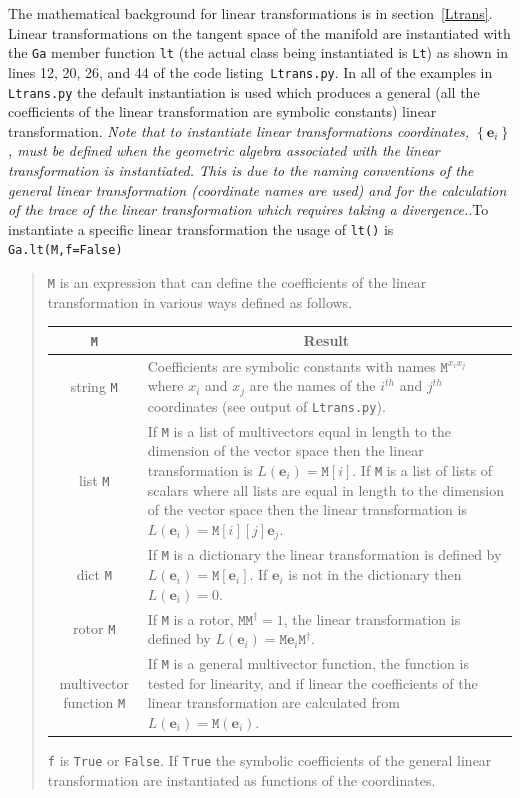 \documentclass[12pt]{report}
\newcommand{\bm}[1]{\boldsymbol{#1}}
\newcommand{\ebf}{\bm{e}}
\newcommand{\mat}[1]{\left [ {#1} \right ]}
\newcommand{\lp}{\left (}
\newcommand{\rp}{\right )}
\newcommand{\lbrc}{\left \{}
\newcommand{\rbrc}{\right \}}
\newcommand{\set}[1]{\lbrc {#1} \rbrc}
\newcommand{\R}{\dagger}
\newcommand{\f}[2]{{#1}\lp {#2} \rp}
\newcommand{\T}[1]{\texttt{#1}}
\begin{document}
The mathematical background for linear transformations is in section~\ref{Ltrans}.  Linear transformations on the tangent space of
the manifold are instantiated with the \T{Ga} member function \T{lt} (the actual class being instantiated is \T{Lt}) as shown in
 lines 12, 20, 26, and 44 of the 
code listing~\T{Ltrans.py}. In all of the examples in \T{Ltrans.py} the default instantiation is used which produces a general (all the
coefficients of the linear transformation are symbolic constants) linear transformation. \emph{Note that to instantiate linear transformations
coordinates, $\set{\bm{e}_{i}}$, must be defined when the geometric algebra associated with the linear transformation is instantiated.  
This is due to the naming conventions of the general linear transformation (coordinate names are used) and for the calculation 
of the trace of the linear transformation which requires taking a divergence.}.To instantiate a specific linear transformation
the usage of \T{lt()} is 
\T{Ga.lt(M,f=False)}
\begin{quote}
	\T{M} is an expression that can define the coefficients of the linear transformation in various ways defined as follows. 
	\begin{center}
    \begin{longtable}{cl}
    \T{M} &  \multicolumn{1}{c}{Result} \\ \hline
	string \T{M} & \parbox[t]{4in}{Coefficients are symbolic constants with names $\T{M}^{x_{i}x_{j}}$ where $x_{i}$ 
					   and $x_{j}$ are the names
	of the $i^{th}$ and $j^{th}$ coordinates (see output of \T{Ltrans.py}). } \\ \hline
	list \T{M} & \parbox[t]{4in}{If \T{M} is a list of multivectors equal in length to the dimension of the vector space then
	             the linear transformation is $\f{L}{\ebf_{i}} = \T{M}\mat{i}$. If \T{M} is a list of lists of scalars where all
	             lists are equal in length to the dimension of the vector space then the linear transformation is
	             $\f{L}{\ebf_{i}} = \T{M}\mat{i}\mat{j}\ebf_{j}$.} \\ \hline
	dict \T{M} & \parbox[t]{4in}{If \T{M} is a dictionary the linear transformation is defined by
	             $\f{L}{\ebf_{i}} = \T{M}\mat{\ebf_{i}}$. If $\ebf_{i}$ is not in the dictionary then $\f{L}{\ebf_{i}} =0$.} \\ \hline
	rotor \T{M} & \parbox[t]{4in}{If \T{M} is a rotor, $\T{M}\T{M}^{\R}=1$, the linear transformation is defined by 
	               $\f{L}{\ebf_{i}} = \T{M}\ebf_{i}\T{M}^{\R}$.} \\ \hline
	multivector function \T{M} & \parbox[t]{4in}{If \T{M} is a general multivector function, the function is tested for linearity, and if
	                             linear the coefficients of the linear transformation are calculated from 
	                             $\f{L}{\ebf_{i}} = \f{\T{M}}{\ebf_{i}}$.} \\ \hline 
	\end{longtable}
	\end{center}
	\vspace{-0.5in}\T{f} is \T{True} or \T{False}. If \T{True} the symbolic coefficients of the general linear transformation are instantiated as functions of the coordinates.
\end{quote}
\end{document}
